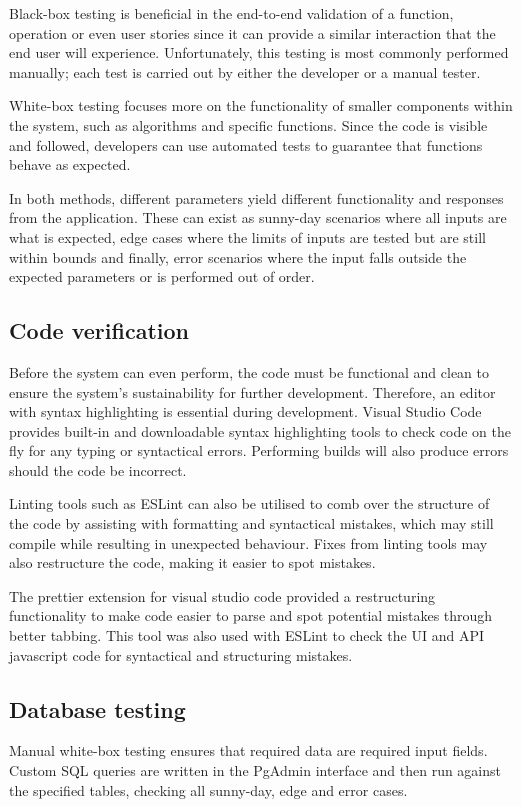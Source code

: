 Black-box testing is beneficial in the end-to-end validation of a function, operation or even user stories since it can provide a similar interaction that the end user will experience. Unfortunately, this testing is most commonly performed manually; each test is carried out by either the developer or a manual tester.

White-box testing focuses more on the functionality of smaller components within the system, such as algorithms and specific functions. Since the code is visible and followed, developers can use automated tests to guarantee that functions behave as expected.

In both methods, different parameters yield different functionality and responses from the application. These can exist as sunny-day scenarios where all inputs are what is expected, edge cases where the limits of inputs are tested but are still within bounds and finally, error scenarios where the input falls outside the expected parameters or is performed out of order.

\subsection{Code verification}
Before the system can even perform, the code must be functional and clean to ensure the system's sustainability for further development. Therefore, an editor with syntax highlighting is essential during development. Visual Studio Code provides built-in and downloadable syntax highlighting tools to check code on the fly for any typing or syntactical errors. Performing builds will also produce errors should the code be incorrect.

Linting tools such as ESLint can also be utilised to comb over the structure of the code by assisting with formatting and syntactical mistakes, which may still compile while resulting in unexpected behaviour. Fixes from linting tools may also restructure the code, making it easier to spot mistakes.

The prettier extension for visual studio code provided a restructuring functionality to make code easier to parse and spot potential mistakes through better tabbing. This tool was also used with ESLint to check the UI and API javascript code for syntactical and structuring mistakes.

\subsection{Database testing}
Manual white-box testing ensures that required data are required input fields. Custom SQL queries are written in the PgAdmin interface and then run against the specified tables, checking all sunny-day, edge and error cases.

